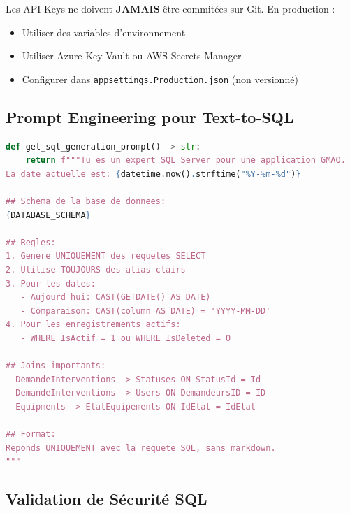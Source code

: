 \documentclass[12pt,a4paper]{article}
\begin{document}
\begin{warningbox}[title={\faKey\ Sécurité des API Keys}]
Les API Keys ne doivent \textbf{JAMAIS} être commitées sur Git. En production :
\begin{itemize}
    \item Utiliser des variables d'environnement
    \item Utiliser Azure Key Vault ou AWS Secrets Manager
    \item Configurer dans \texttt{appsettings.Production.json} (non versionné)
\end{itemize}
\end{warningbox}

\subsection{Prompt Engineering pour Text-to-SQL}

\begin{lstlisting}[language=Python, caption=Prompt système pour génération SQL]
def get_sql_generation_prompt() -> str:
    return f"""Tu es un expert SQL Server pour une application GMAO.
La date actuelle est: {datetime.now().strftime("%Y-%m-%d")}

## Schema de la base de donnees:
{DATABASE_SCHEMA}

## Regles:
1. Genere UNIQUEMENT des requetes SELECT
2. Utilise TOUJOURS des alias clairs
3. Pour les dates:
   - Aujourd'hui: CAST(GETDATE() AS DATE)
   - Comparaison: CAST(column AS DATE) = 'YYYY-MM-DD'
4. Pour les enregistrements actifs:
   - WHERE IsActif = 1 ou WHERE IsDeleted = 0

## Joins importants:
- DemandeInterventions -> Statuses ON StatusId = Id
- DemandeInterventions -> Users ON DemandeursID = ID
- Equipments -> EtatEquipements ON IdEtat = IdEtat

## Format:
Reponds UNIQUEMENT avec la requete SQL, sans markdown.
"""
\end{lstlisting}

\subsection{Validation de Sécurité SQL}
\end{document}
